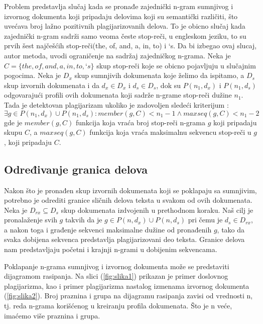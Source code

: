\documentclass[a4paper]{article}
\begin{document}
\par Problem predstavlja slučaj kada se pronađe zajednički n-gram sumnjivog i izvornog dokumenta   koji pripadaju delovima koji su semantički različiti, što uvećava broj lažno pozitivnih plagijarizovanih delova. To je obicno slučaj kada zajednički n-gram sadrži samo veoma česte stop-reči, u engleskom jeziku, to su prvih šest najčešćih stop-reči(the, of, and, a, in, to) i ‘s. Da bi izbegao ovaj slucaj, autor metoda, uvodi ograničenje na sadržaj zajedničkog n-grama. Neka je \( C = \{the, of, and, a, in, to,‘s\} \) skup stop-reči koje se obicno pojavljuju u slučajnim pogocima. Neka je \(D_{x}\) skup sumnjivih dokumenata koje želimo da ispitamo, a \(D_{s}\) skup  izvornih dokumenata i da \(d_{x} \in D_{x}\) i \(d_{s} \in D_{s}\), dok su \(P(n_{1},d_{x})\) i \(P(n_{1},d_{s})\) odgovarajući profili ovih dokumenata koji sadrže n-grame stop-reči dužine \(n_{1}\). Tada je detektovan plagijarizam ukoliko je zadovoljen sledeći kriterijum : 
	\[ \exists g \in P(n_{1}  ,d_{x}) \cup P(n_{1} ,d_{s} ): member(g,C)<n_{1}-1 \land maxseq(g,C)<n_{1}-2 \]
gde je \( member(g,C)\) funkcija koja vraća broj stop-reči n-grama \(g\) koji pripadaju skupu \(C\), a \(maxseq(g,C)\) funkcija koja vraća maksimalnu sekvencu stop-reči u \(g\), koji pripadaju \(C\).

\subsection{Određivanje granica delova}
\label{subsec:odredjivanje granica delova}

Nakon što je pronađen skup izvornih dokumenata koji se poklapaju sa sumnjivim, potrebno je odrediti granice sličnih delova  teksta u svakom od ovih dokumenata. Neka je \( D_{rx} \subseteq D_{s} \) skup dokumenata izdvojenih u prethodnom koraku. Naš cilj je pronalaženje svih \(g\) takvih da je \(g\in P(n, d_{x}) \cup P(n, d_{s})\) pri čemu je \(d_{s} \in D_{rx}\), a nakon toga i građenje sekvenci maksimalne dužine od pronađenih \(g\), tako da svaka dobijena sekvenca predstavlja plagijarizovani deo teksta. Granice delova nam predstavljaju početni i krajnji n-grami u dobijenim sekvencama.  

\par Poklapanje n-grama sumnjivog i izvornog dokumenta može se predstaviti dijagramom rasipanja. Na slici (\ref{fig:slika1}) prikazan je  primer doslovnog plagijarizma, kao i primer plagijarizma nastalog izmenama izvornog dokumenta (\ref{fig:slika2}). Broj praznina i grupa na dijagramu rasipanja zavisi od vrednosti n, tj. reda n-grama korišćenog u kreiranju profila dokumenata. Što je n veće, imaćemo više praznina i grupa.
\end{document}
